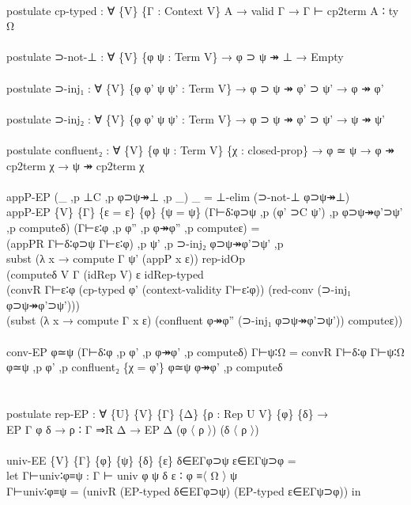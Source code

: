 {\begin{code}
{\>\<\\
\>postulate cp-typed : ∀ \{V\} \{Γ : Context V\} A → valid Γ → Γ ⊢ cp2term A ∶ ty Ω\<\\
\>\<\\
\>postulate ⊃-not-⊥ : ∀ \{V\} \{φ ψ : Term V\} → φ ⊃ ψ ↠ ⊥ → Empty\<\\
\>\<\\
\>postulate ⊃-inj₁ : ∀ \{V\} \{φ φ' ψ ψ' : Term V\} → φ ⊃ ψ ↠ φ' ⊃ ψ' → φ ↠ φ'\<\\
\>\<\\
\>postulate ⊃-inj₂ : ∀ \{V\} \{φ φ' ψ ψ' : Term V\} → φ ⊃ ψ ↠ φ' ⊃ ψ' → ψ ↠ ψ'\<\\
\>\<\\
\>postulate confluent₂ : ∀ \{V\} \{φ ψ : Term V\} \{χ : closed-prop\} → φ ≃ ψ → φ ↠ cp2term χ → ψ ↠ cp2term χ\<\\
\>\<\\
\>appP-EP (\_ ,p ⊥C ,p φ⊃ψ↠⊥ ,p \_) \_ = ⊥-elim (⊃-not-⊥ φ⊃ψ↠⊥)\<\\
\>appP-EP \{V\} \{Γ\} \{ε = ε\} \{φ\} \{ψ = ψ\} (Γ⊢δ∶φ⊃ψ ,p (φ' ⊃C ψ') ,p φ⊃ψ↠φ'⊃ψ' ,p computeδ) (Γ⊢ε∶φ ,p φ'' ,p φ↠φ'' ,p computeε) = \<\\
\>  (appPR Γ⊢δ∶φ⊃ψ Γ⊢ε∶φ) ,p ψ' ,p ⊃-inj₂ φ⊃ψ↠φ'⊃ψ' ,p \<\\
\>  subst (λ x → compute Γ ψ' (appP x ε)) rep-idOp \<\\
\>  (computeδ V Γ (idRep V) ε idRep-typed \<\\
\>    (convR Γ⊢ε∶φ (cp-typed φ' (context-validity Γ⊢ε∶φ)) (red-conv (⊃-inj₁ φ⊃ψ↠φ'⊃ψ')))\<\\
\>  (subst (λ x → compute Γ x ε) (confluent φ↠φ'' (⊃-inj₁ φ⊃ψ↠φ'⊃ψ')) computeε))\<\\
\>\<\\
\>conv-EP φ≃ψ (Γ⊢δ∶φ ,p φ' ,p φ↠φ' ,p computeδ) Γ⊢ψ∶Ω = convR Γ⊢δ∶φ Γ⊢ψ∶Ω φ≃ψ ,p φ' ,p confluent₂ \{χ = φ'\} φ≃ψ φ↠φ' ,p computeδ\<\\
\>\<\\
\>\<\\
\>postulate rep-EP : ∀ \{U\} \{V\} \{Γ\} \{Δ\} \{ρ : Rep U V\} \{φ\} \{δ\} →\<\\
\>                 EP Γ φ δ → ρ ∶ Γ ⇒R Δ → EP Δ (φ 〈 ρ 〉) (δ 〈 ρ 〉)\<\\
\>\<\\
\>univ-EE \{V\} \{Γ\} \{φ\} \{ψ\} \{δ\} \{ε\} δ∈EΓφ⊃ψ ε∈EΓψ⊃φ = \<\\
\>  let Γ⊢univ∶φ≡ψ : Γ ⊢ univ φ ψ δ ε ∶ φ ≡〈 Ω 〉 ψ\<\\
\>      Γ⊢univ∶φ≡ψ = (univR (EP-typed δ∈EΓφ⊃ψ) (EP-typed ε∈EΓψ⊃φ)) in\<\\
}
\end{code}}
